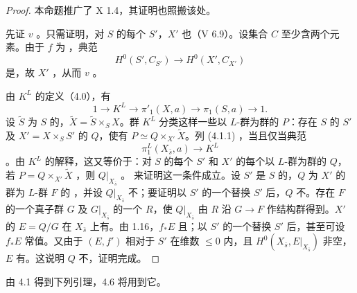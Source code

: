 \begin{proof}
本命题推广了 X 1.4，其证明也照搬该处。

先证 $v$ 。只需证明，对 $S$ 的每个 $S'$，$X'$ 也（V 6.9）。设集合 $C$ 至少含两个元素。由于 $f$ 为 ，典范
\[H^0(S',C_{S'})\longrightarrow H^0(X',C_{X'})\]
是，故 $X'$ ，从而 $v$ 。

由 $K^L$ 的定义（4.0），有
\[1\longrightarrow K^L\longrightarrow\pi'_1(X,a)\longrightarrow\pi_1(S,a)\longrightarrow1.\]
设 $\widetilde S$ 为 $S$ 的，$\widetilde X=\widetilde S\times_S X$。群 $K^L$ 分类这样一些以 $L$-群为群的  $P$：存在 $S$ 的 $S'$ 及 $X'=X\times_S S'$ 的  $Q$，使有 $P\simeq Q\times_{X'}\widetilde X$。列 (4.1.1) ，当且仅当典范
\[\pi_1^L(X_{\bar s},a)\longrightarrow K^L\]
。由 $K^L$ 的解释，这又等价于：对 $S$ 的每个 $S'$ 和 $X'$ 的每个以 $L$-群为群的  $Q$，若 $P=Q\times_{X'}\widetilde X$ ，则 $Q|_{X_{\bar s}}$ 。
来证明这一条件成立。设 $S'$ 是 $S$ 的，$Q$ 为 $X'$ 的群为 $L$-群 $F$ 的 ，并设 $Q|_{X_{\bar s}}$ 不；要证明以 $S'$ 的一个替换 $S'$ 后，$Q$ 不。存在 $F$ 的一个真子群 $G$ 及 $G|_{X_{\bar s}}$ 的一个 $R$，使 $Q|_{X_{\bar s}}$ 由 $R$ 沿 $G\to F$ 作结构群得到。$X'$ 的 $E=Q/G$ 在 $X_{\bar s}$ 上有。由 1.16，$f_*E$ 且；以 $S'$ 的一个替换 $S'$ 后，甚至可设 $f_*E$ 常值。又由于 $(E,f')$ 相对于 $S'$ 在维数 $\leq0$ 内，且 $H^0(X_{\bar s},E|_{X_{\bar s}})$ 非空，$E$ 有。这说明 $Q$ 不，证明完成。
\end{proof}
由 4.1 得到下列引理，4.6 将用到它。

